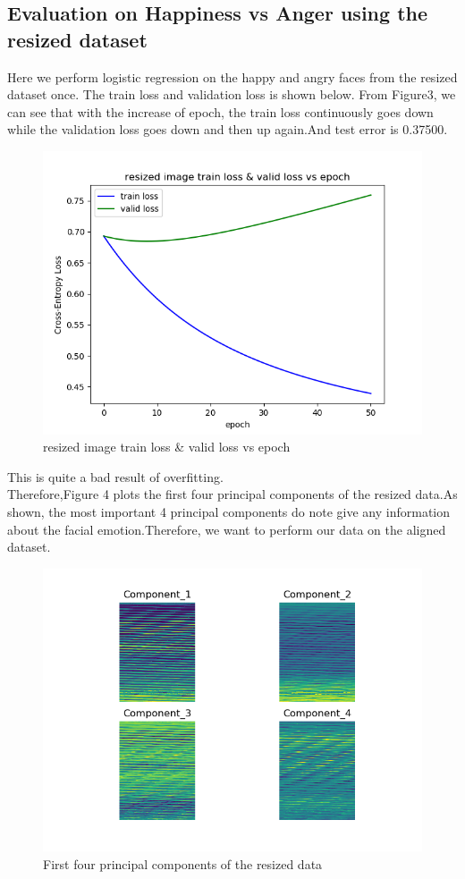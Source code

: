 \documentclass{article} %
\begin{document}
\subsection {Evaluation on Happiness vs Anger using the resized dataset}
Here we perform logistic regression on the happy and angry faces from the resized dataset once. The train loss and validation loss is shown below.
From Figure3, we can see that with the increase of epoch, the train loss continuously goes down while the validation loss goes down and then up again.And test error is 0.37500.
\begin{figure}[htb]
	\centering
	\includegraphics[scale=0.5]{./graph/resized_tvloss.png}
	\caption{resized image train loss \& valid loss vs epoch}
\end{figure} 
This is quite a bad result of overfitting. \\
Therefore,Figure 4 plots the first four principal components of the resized data.As shown, the most important 4 principal components do note give any information about the facial emotion.Therefore, we want to perform our data on the aligned dataset.
\begin{figure}[h]
	\centering
	\includegraphics[scale=0.5]{./graph/pca_resized.png}
	\caption{First four principal components of the resized data}
\end{figure} 
\end{document}
